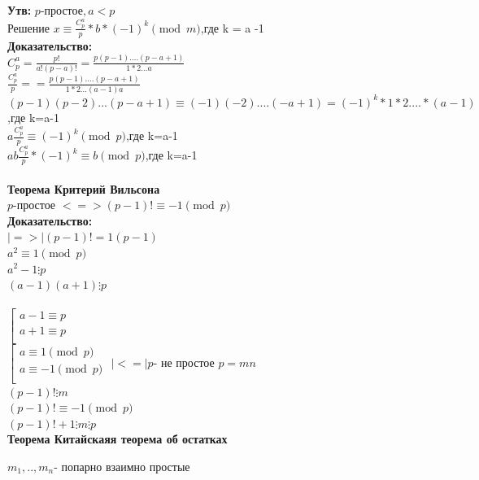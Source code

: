 \documentclass[12pt]{article}
\begin{document}
        \textbf{Утв:}
    $p$-простое$ , a<p $\\
        Решение  $x\equiv \frac{C_p^a}{p}*b*(-1)^k \pmod{m}$,где k = a -1\\
        \textbf{Доказательство:}\\
    $ C_p^a = \frac{p!}{a!(p-a)!}=\frac{p(p-1)....(p-a+1)}{1*2...a} $\\
    $\frac{C_p^a}{p}= =\frac{p(p-1)....(p-a+1)}{1*2...(a-1)a}$\\
    $(p-1)(p-2)...(p-a+1)\equiv (-1)(-2)....(-a+1) = (-1)^k*1*2....*(a-1)$,где k=a-1\\
    $a\frac{C_p^a}{p}\equiv (-1)^k \pmod{p}$,где k=a-1\\
    $ab\frac{C_p^a}{p} * (-1)^k\equiv b \pmod{p} $,где k=a-1\\
        \\
        \textbf{Теорема Критерий Вильсона}
        \\
    $p$-простое $<=> (p-1)! \equiv -1 \pmod{p} $\\
        \textbf{Доказательство:}\\
    $|=>|  (p-1)!= 1(p-1) $\\
    $a^2 \equiv 1 \pmod{p}$\\
    $a^2 -1 \vdots p$\\
    $(a-1)(a+1) \vdots p$\\
        \\
    $\left[ \begin{array}{l}
        a-1  \equiv p \\
        a+1  \equiv p \\
    \end{array} \right.
    $
        \\$\left[ \begin{array}{l}
            a \equiv 1 \pmod{p}  \\
            a \equiv -1 \pmod{p} \\
        \end{array} \right.
    $
    $|<=| p $- не простое $p = mn$\\
    $(p-1)!\vdots m $\\
    $(p-1)!\equiv -1 \pmod{p}$\\
    $(p-1)!+1\vdots m\vdots p $\\

    \textbf{Теорема Китайскаяя теорема об остатках}

    $m_1,..,m_n $- попарно взаимно простые \\
\end{document}
